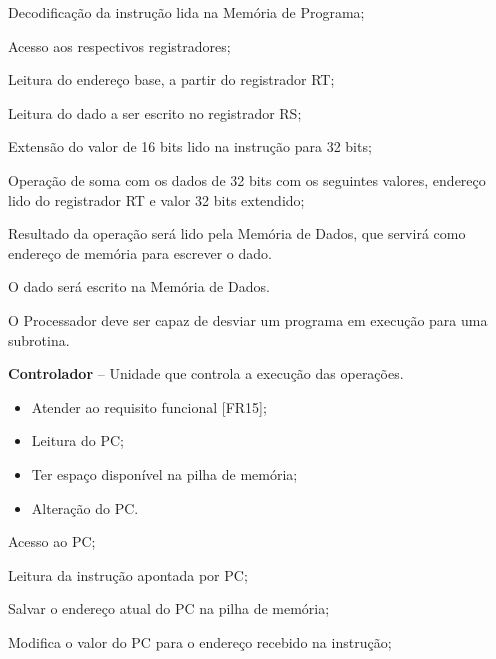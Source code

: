 \documentclass{article}
\begin{document}
  
  \begin{mainflow}
    \item Decodificação da instrução lida na Memória de Programa;
	\item Acesso aos respectivos registradores;
	\item Leitura do endereço base, a partir do registrador RT;
	\item Leitura do dado a ser escrito no registrador RS;
	\item Extensão do valor de 16 bits lido na instrução para 32 bits;
	\item Operação de soma com os dados de 32 bits com os seguintes valores, endereço lido do registrador RT e valor 32 bits extendido;
	\item Resultado da operação será lido pela Memória de Dados, que servirá como endereço de memória para escrever o dado.
	\item O dado será escrito na Memória de Dados.


  \end{mainflow}
  
  O Processador deve ser capaz de desviar um programa em execução para uma subrotina.
  \actors
    \begin{description}
     \item \textbf{Controlador} – Unidade que controla a execução das operações.
    \end{description}
    
  \preconditions 
    \begin{itemize}
     \item Atender ao requisito funcional [FR15];
     \item Leitura do PC;
     \item Ter espaço disponível na pilha de memória;
    \end{itemize}

  \postconditions
    \begin{itemize}
     \item Alteração do PC.
    \end{itemize}
  
  
  \begin{mainflow}
    \item Acesso ao PC;
    \item Leitura da instrução apontada por PC;
    \item Salvar o endereço atual do PC na pilha de memória;
    \item Modifica o valor do PC para o endereço recebido na instrução;
  \end{mainflow}
  
\end{document}
